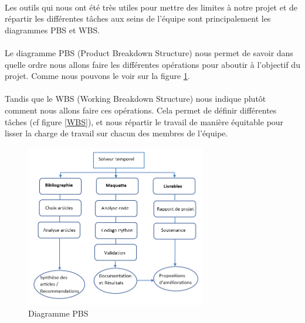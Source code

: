     \paragraph{}
	Les outils qui nous ont été très utiles pour mettre des limites à notre projet et de répartir les différentes tâches aux seins de l'équipe sont principalement les diagrammes PBS et WBS.
	\paragraph{}
	Le diagramme PBS (Product Breakdown Structure) nous permet de savoir dans quelle ordre nous allons faire les différentes opérations pour aboutir à l'objectif du projet. Comme nous pouvons le voir sur la figure \ref{PBS}.
	\paragraph{}
	Tandis que le WBS (Working Breakdown Structure) nous indique plutôt comment nous allons faire ces opérations. Cela permet de définir différentes tâches (cf figure \ref{WBS}), et nous répartir le travail de manière équitable pour lisser la charge de travail sur chacun des membres de l'équipe. 
    \begin{figure}[h]
        \centering
        \includegraphics[width=0.7\textwidth]{images/WBS_detaille.PNG}
        \caption{Diagramme PBS}
    \label{PBS}
    \end{figure}
\newpage
